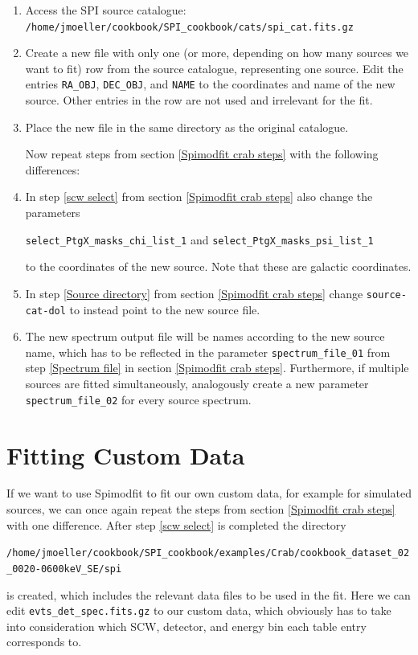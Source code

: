\documentclass{report}
\begin{document}
\begin{enumerate}
    \item Access the SPI source catalogue: \verb|/home/jmoeller/cookbook/SPI_cookbook/cats/spi_cat.fits.gz|
    \item Create a new file with only one (or more, depending on how many sources we want to fit) row from the source catalogue, representing one source. Edit the entries \verb|RA_OBJ|, \verb|DEC_OBJ|, and \verb|NAME| to the coordinates and name of the new source. Other entries in the row are not used and irrelevant for the fit.
    \item Place the new file in the same directory as the original catalogue.
    
    Now repeat steps from section \ref{Spimodfit crab steps} with the following differences:
    \item In step \ref{scw select} from section \ref{Spimodfit crab steps} also change the parameters 
    
    \verb|select_PtgX_masks_chi_list_1| and \verb|select_PtgX_masks_psi_list_1| 
    
    to the coordinates of the new source. Note that these are galactic coordinates.
    \item In step \ref{Source directory} from section \ref{Spimodfit crab steps} change \verb|source-cat-dol| to instead point to the new source file.
    \item The new spectrum output file will be names according to the new source name, which has to be reflected in the parameter \verb|spectrum_file_01| from step \ref{Spectrum file} in section \ref{Spimodfit crab steps}. Furthermore, if multiple sources are fitted simultaneously, analogously create a new parameter \verb|spectrum_file_02| for every source spectrum.
\end{enumerate}


\section{Fitting Custom Data}
If we want to use Spimodfit to fit our own custom data, for example for simulated sources, we can once again repeat the steps from section \ref{Spimodfit crab steps} with one difference. After step \ref{scw select} is completed the directory

\verb|/home/jmoeller/cookbook/SPI_cookbook/examples/Crab/cookbook_dataset_02_0020-0600keV_SE/spi|

is created, which includes the relevant data files to be used in the fit. Here we can edit \verb|evts_det_spec.fits.gz| to our custom data, which obviously has to take into consideration which SCW, detector, and energy bin each table entry corresponds to. 
\end{document}
